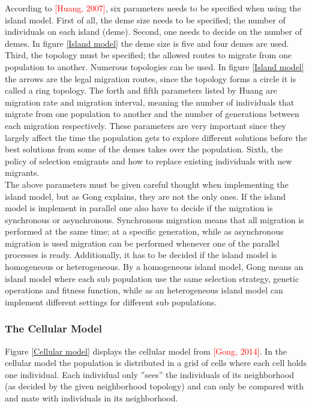 According to \textcolor{red}{[Huang, 2007]}, six parameters needs to be specified when using the island model. First of all, the deme size needs to be specified; the number of individuals on each island (deme). Second, one needs to decide on the number of demes. In figure \ref{Island model} the deme size is five and four demes are used. Third, the topology must be specified; the allowed routes to migrate from one population to another. Numerous topologies can be used. In figure \ref{Island model} the arrows are the legal migration routes, since the topology forms a circle it is called a ring topology. The forth and fifth parameters listed by Huang are migration rate and migration interval, meaning the number of individuals that migrate from one population to another and the number of generations between each migration respectively. These parameters are very important since they largely affect the time the population gets to explore different solutions before the best solutions from some of the demes takes over the population. Sixth, the policy of selection emigrants and how to replace existing individuals with new migrants. \\


\noindent The above parameters must be given careful thought when implementing the island model, but as Gong explains, they are not the only ones. If the island model is implement in parallel one also have to decide if the migration is synchronous or asynchronous. Synchronous migration means that all migration is performed at the same time; at a specific generation, while as asynchronous migration is used migration can be performed whenever one of the parallel processes is ready. Additionally, it has to be decided if the island model is homogeneous or heterogeneous. By a homogeneous island model, Gong means an island model where each sub population use the same selection strategy, genetic operations and fitness function, while as an heterogeneous island model can implement different settings for different sub populations.


\subsubsection{The Cellular Model}
Figure \ref{Cellular model} displays the cellular model from \textcolor{red}{[Gong, 2014]}. In the cellular model the population is distributed in a grid of cells where each cell holds one individual. Each individual only ''sees'' the individuals of its neighborhood (as decided by the given neighborhood topology) and can only be compared with and mate with individuals in its neighborhood. \\


